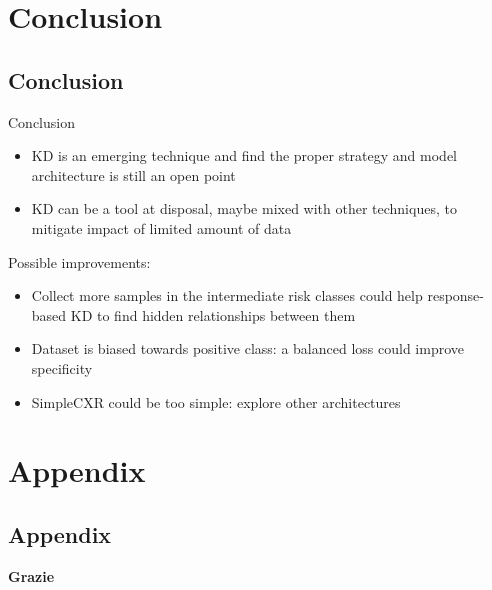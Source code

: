 \documentclass[compress,aspectratio=169,xcolor=table]{beamer}
\begin{document}
\section{Conclusion}\subsection{Conclusion}


\begin{frame}{Conclusion}
	\begin{itemize}
		\item KD is an emerging technique and find the proper strategy and model architecture is still an open point
		\item KD can be a tool at disposal, maybe mixed with other techniques, to mitigate impact of limited amount of data
	\end{itemize}

	Possible improvements:
	\begin{itemize}
		\item Collect more samples in the intermediate risk classes could help response-based KD to find hidden relationships between them
		\item Dataset is biased towards positive class: a balanced loss could improve specificity
		\item SimpleCXR could be too simple: explore other architectures
	\end{itemize}
\end{frame}


\appendix
\section*{Appendix}\subsection*{Appendix}
\ClearShipoutPictureFG


\begin{frame}
	\begin{center}
		\inserttitlegraphic\par
		\textbf{Grazie}\par
	\end{center}
\end{frame}

\SetLogo
\end{document}
